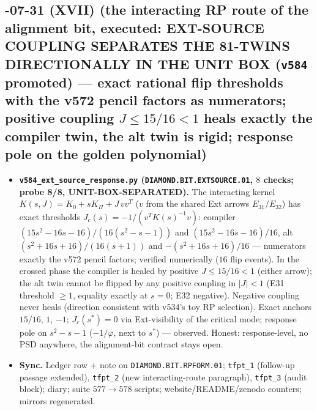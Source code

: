 \subsection*{-07-31 (XVII) (the interacting RP route of the alignment bit, executed: EXT-SOURCE COUPLING SEPARATES THE 81-TWINS DIRECTIONALLY IN THE UNIT BOX (\texttt{v584} promoted) --- exact rational flip thresholds with the v572 pencil factors as numerators; positive coupling $J\le15/16<1$ heals exactly the compiler twin, the alt twin is rigid; response pole on the golden polynomial)}
\begin{itemize}[leftmargin=1.5em]
\item \textbf{\texttt{v584\_ext\_source\_response.py} (\texttt{DIAMOND.BIT.EXTSOURCE.01}, $8$
checks; probe 8/8, UNIT-BOX-SEPARATED).} The interacting kernel $K(s,J)=K_0+sK_\Pi+J\,vv^T$
($v$ from the shared Ext arrows $E_{31}/E_{32}$) has exact thresholds
$J_c(s)=-1/(v^TK(s)^{-1}v)$: compiler $(15s^2{-}16s{-}16)/(16(s^2{-}s{-}1))$ and
$(15s^2{-}16s{-}16)/16$, alt $(s^2{+}16s{+}16)/(16(s{+}1))$ and $-(s^2{+}16s{+}16)/16$ ---
numerators exactly the v572 pencil factors; verified numerically ($16$ flip events).  In the
crossed phase the compiler is healed by positive $J\le15/16<1$ (either arrow); the alt twin
cannot be flipped by any positive coupling in $|J|<1$ (E31 threshold $\ge1$, equality exactly
at $s=0$; E32 negative).  Negative coupling never heals (direction consistent with v534's toy
RP selection).  Exact anchors $15/16$, $1$, $-1$; $J_c(s^*)=0$ via Ext-visibility of the
critical mode; response pole on $s^2{-}s{-}1$ ($-1/\varphi$, next to $s^*$) --- observed.
Honest: response-level, no PSD anywhere, the alignment-bit contract stays open.
\item \textbf{Sync.} Ledger row + note on \texttt{DIAMOND.BIT.RPFORM.01};
\texttt{tfpt\_1} (follow-up passage extended), \texttt{tfpt\_2} (new interacting-route
paragraph), \texttt{tfpt\_3} (audit block); diary; suite $577\to578$ scripts;
website/README/zenodo counters; mirrors regenerated.
\end{itemize}

